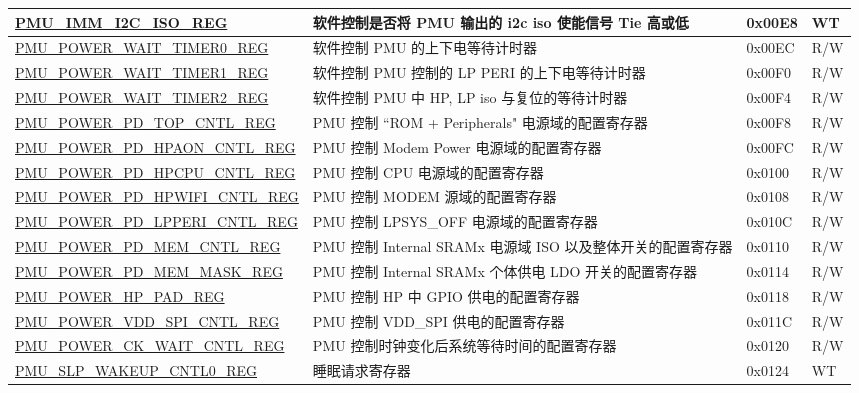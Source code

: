 \begin{longtable}{ | p{6.5cm} | p{8cm} | p{1.3cm} | p{1cm} | }
\hyperref[regdesc:PMUIMMI2CISOREG]{PMU\_IMM\_I2C\_ISO\_REG} & 软件控制是否将 PMU 输出的 i2c iso 使能信号 Tie 高或低 & 0x00E8 & WT \\ \hline
\hyperref[regdesc:PMUPOWERWAITTIMER0REG]{PMU\_POWER\_WAIT\_TIMER0\_REG} & 软件控制 PMU 的上下电等待计时器 & 0x00EC & R/W \\ \hline
\hyperref[regdesc:PMUPOWERWAITTIMER1REG]{PMU\_POWER\_WAIT\_TIMER1\_REG} & 软件控制 PMU 控制的 LP PERI 的上下电等待计时器 & 0x00F0 & R/W \\ \hline
\hyperref[regdesc:PMUPOWERWAITTIMER2REG]{PMU\_POWER\_WAIT\_TIMER2\_REG} & 软件控制 PMU 中 HP, LP iso 与复位的等待计时器 & 0x00F4 & R/W \\ \hline
\hyperref[regdesc:PMUPOWERPDTOPCNTLREG]{PMU\_POWER\_PD\_TOP\_CNTL\_REG} & PMU 控制 ``ROM + Peripherals" 电源域的配置寄存器 & 0x00F8 & R/W \\ \hline
\hyperref[regdesc:PMUPOWERPDHPAONCNTLREG]{PMU\_POWER\_PD\_HPAON\_CNTL\_REG} & PMU 控制 Modem Power 电源域的配置寄存器 & 0x00FC & R/W \\ \hline
\hyperref[regdesc:PMUPOWERPDHPCPUCNTLREG]{PMU\_POWER\_PD\_HPCPU\_CNTL\_REG} & PMU 控制 CPU 电源域的配置寄存器 & 0x0100 & R/W \\ \hline
\hyperref[regdesc:PMUPOWERPDHPWIFICNTLREG]{PMU\_POWER\_PD\_HPWIFI\_CNTL\_REG} & PMU 控制 MODEM 源域的配置寄存器 & 0x0108 & R/W \\ \hline
\hyperref[regdesc:PMUPOWERPDLPPERICNTLREG]{PMU\_POWER\_PD\_LPPERI\_CNTL\_REG} & PMU 控制 LPSYS\_OFF 电源域的配置寄存器 & 0x010C & R/W \\ \hline
\hyperref[regdesc:PMUPOWERPDMEMCNTLREG]{PMU\_POWER\_PD\_MEM\_CNTL\_REG} & PMU 控制 Internal SRAMx 电源域 ISO 以及整体开关的配置寄存器 & 0x0110 & R/W \\ \hline
\hyperref[regdesc:PMUPOWERPDMEMMASKREG]{PMU\_POWER\_PD\_MEM\_MASK\_REG} & PMU 控制 Internal SRAMx 个体供电 LDO 开关的配置寄存器 & 0x0114 & R/W \\ \hline
\hyperref[regdesc:PMUPOWERHPPADREG]{PMU\_POWER\_HP\_PAD\_REG} & PMU 控制 HP 中 GPIO 供电的配置寄存器 & 0x0118 & R/W \\ \hline
\hyperref[regdesc:PMUPOWERVDDSPICNTLREG]{PMU\_POWER\_VDD\_SPI\_CNTL\_REG} & PMU 控制 VDD\_SPI 供电的配置寄存器 & 0x011C & R/W \\ \hline
\hyperref[regdesc:PMUPOWERCKWAITCNTLREG]{PMU\_POWER\_CK\_WAIT\_CNTL\_REG} & PMU 控制时钟变化后系统等待时间的配置寄存器 & 0x0120 & R/W \\ \hline
\hyperref[regdesc:PMUSLPWAKEUPCNTL0REG]{PMU\_SLP\_WAKEUP\_CNTL0\_REG} & 睡眠请求寄存器 & 0x0124 & WT \\ \hline

\end{longtable}

